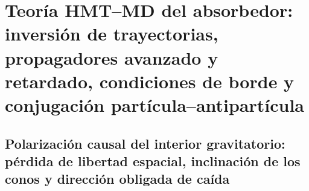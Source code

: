\chapter{Teoría HMT--MD del absorbedor: inversión de trayectorias, propagadores avanzado y retardado, condiciones de borde y conjugación partícula--antipartícula}
\label{chap:md-absorbedor-definitivo}
\begingroup
\let\HMTOwnerSection\section
\let\HMTOwnerSubsection\subsection
\let\HMTOwnerSubsubsection\subsubsection
\let\HMTOwnerParagraph\paragraph
\let\chapter\HMTOwnerSection
\let\section\HMTOwnerSubsection
\let\subsection\HMTOwnerSubsubsection
\let\subsubsection\HMTOwnerParagraph

\endgroup


\chapter{Polarización causal del interior gravitatorio: pérdida de libertad espacial, inclinación de los conos y dirección obligada de caída}
\label{chap:md-polarizacion-causal-interior}



